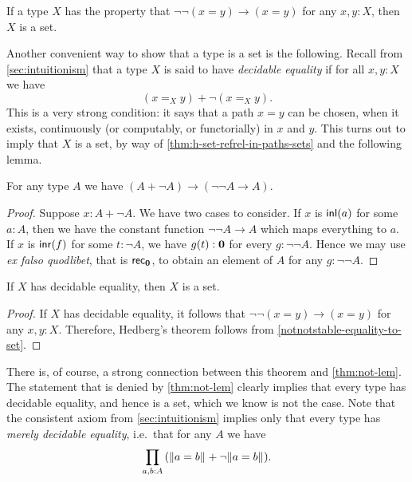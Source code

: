 \begin{cor}\label{notnotstable-equality-to-set}
  If a type $X$ has the property that $\neg\neg(x=y)\to(x=y)$ for any $x,y:X$, then $X$ is a set.
\end{cor}

Another convenient way to show that a type is a set is the following.
Recall from \autoref{sec:intuitionism} that a type $X$ is said to have \emph{decidable equality} if for all $x, y : X$ we have
\[(x =_X y) + \neg (x =_X y).\]
This is a very strong condition: it says that a path $x=y$ can be chosen, when it exists, continuously (or computably, or functorially) in $x$ and $y$.
This turns out to imply that $X$ is a set, by way of \autoref{thm:h-set-refrel-in-paths-sets} and the following lemma.

\begin{lem}
For any type $A$ we have $(A+\neg A)\to(\neg\neg A\to A)$.
\end{lem}

\begin{proof}
Suppose $x:A+\neg A$. We have two cases to consider.
If $x$ is ${\mathsf{inl}}(a)$ for some $a:A$, then we have the constant function $\neg\neg A
\to A$ which maps everything to $a$. If $x$ is ${\mathsf{inr}}(f)$ for some $t:\neg A$,
we have $g(t):\mathbf{0}$ for every $g:\neg\neg A$. Hence we may use
\textit{ex falso quodlibet}, that is $\mathsf{rec}_{\mathbf{0}}$, to obtain an element of $A$ for any $g:\neg\neg A$.
\end{proof}

\begin{thm}[Hedberg]\label{thm:hedberg}
  If $X$ has decidable equality, then $X$ is a set.
\end{thm}

\begin{proof}
If $X$ has decidable equality, it follows that $\neg\neg(x=y)\to(x=y)$ for any
$x,y:X$. Therefore, Hedberg's theorem follows from 
\autoref{notnotstable-equality-to-set}.
\end{proof}

There is, of course, a strong connection between this theorem and \autoref{thm:not-lem}.
The statement \LEM{\infty} that is denied by \autoref{thm:not-lem} clearly implies that every type has decidable equality, and hence is a set, which we know is not the case.
Note that the consistent axiom \LEM{} from \autoref{sec:intuitionism} implies only that every type has \emph{merely decidable equality}, i.e.\ that for any $A$ we have
\[ \prd{a,b:A} (\brck{a=b} + \neg\brck{a=b}). \]

